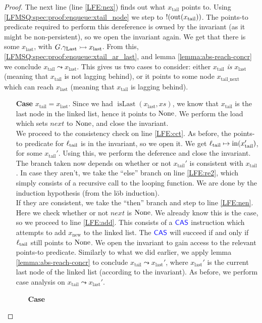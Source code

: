 \documentclass[a4paper, 10pt]{report}
\theoremstyle{definition}
\newcommand{\xsc}{xs}
\newcommand{\isLast}{\operatorname{isLast}}
\newcommand{\locN}[1]{\loc_{\mathrm{#1}}}
\newcommand{\loctail}{\locN{tail}}
\newcommand{\nIn}[1]{\operatorname{in}(#1)}
\newcommand{\nOut}[1]{\operatorname{out}(#1)}
\newcommand{\node}{x}
\newcommand{\nodeN}[1]{\node_{\mathrm{#1}}}
\newcommand{\nodetail}{\nodeN{tail}}
\newcommand{\nodelast}{\nodeN{last}}
\newcommand{\nodenew}{\nodeN{new}}
\newcommand{\nodetailnext}{\nodeN{tail\_next}}
\newcommand{\Qg}{G}
\newcommand{\glast}{\gname_{\mathrm{Last}}}
\newcommand{\reach}[2]{#1 \leadsto #2}
\newcommand{\ap}[2]{#1 \rightarrowtail #2}
\begin{document}
\begin{proof}
  The next line (line \ref{LFE:nex}) finds out what $\nodetail$ points to. Using \ref{LFMSQ:spec:proof:enqueue:xtail_node} we step to $\deref (\nOut{\nodetail})$. The points-to predicate required to perform this dereference is owned by the invariant (as it might be non-persistent), so we open the invariant again. We get that there is some $\nodelast$, with $\ap{\Qg.\glast}{\nodelast}$. From this, \ref{LFMSQ:spec:proof:enqueue:xtail_ar_last}, and lemma \ref{lemma:abs-reach-concr} we conclude $\reach{\nodetail}{\nodelast}$. This gives us two cases to consider: either $\nodetail$ \textit{is} $\nodelast$ (meaning that $\nodetail$ is not lagging behind), or it points to some node $\nodetailnext$ which can reach $\nodelast$ (meaning that $\nodetail$ is lagging behind).
  \begin{itemize}
    \item[\textbf{Case}]
    $\nodetail = \nodelast$. Since we had $\isLast(\nodelast, \xsc)$, we know that $\nodetail$ is the last node in the linked list, hence it points to $\operatorname{None}$. We perform the load which sets $next$ to $\operatorname{None}$, and close the invariant.\\
    We proceed to the consistency check on line \ref{LFE:cct}. As before, the points-to predicate for $\loctail$ is in the invariant, so we open it. We get $\loctail \mapsto \nIn{\nodetail'}$, for some $\nodetail'$. Using this, we perform the deference and close the invariant. The branch taken now depends on whether or not $\nodetail'$ is consistent with $\nodetail$. In case they aren't, we take the ``else'' branch on line \ref{LFE:re2}, which simply consists of a recursive call to the looping function. We are done by the induction hypothesis (from the löb induction).\\
    If they are consistent, we take the ``then'' branch and step to line \ref{LFE:nen}. Here we check whether or not $next$ is $\operatorname{None}$. We already know this is the case, so we proceed to line \ref{LFE:add}. This consists of a $\textsf{\color{blue} CAS}$ instruction which attempts to add $\nodenew$ to the linked list. The $\textsf{\color{blue} CAS}$ will succeed if and only if $\loctail$ still points to $\operatorname{None}$. We open the invariant to gain access to the relevant points-to predicate. Similarly to what we did earlier, we apply lemma \ref{lemma:abs-reach-concr} to conclude $\reach{\nodetail}{\nodelast'}$, where $\nodelast'$ is the current last node of the linked list (according to the invariant). As before, we perform case analysis on $\reach{\nodetail}{\nodelast'}$.
    \begin{itemize}
      \item[\textbf{Case}]

\end{itemize}
\end{itemize}
\end{proof}
\end{document}
